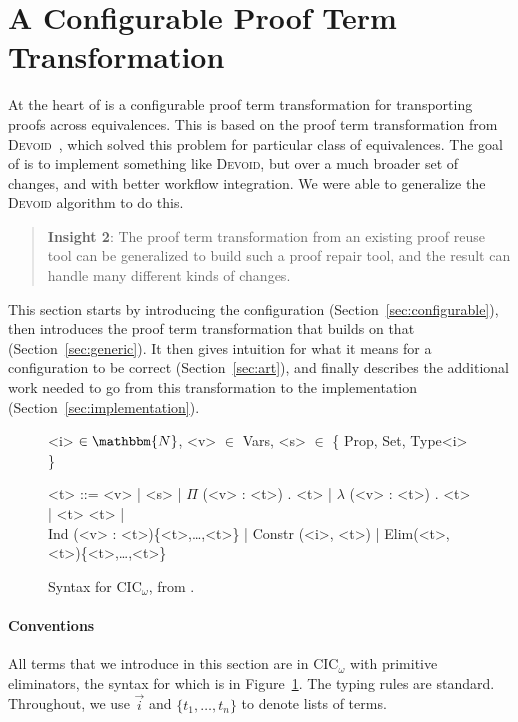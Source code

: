 \section{A Configurable Proof Term Transformation}
\label{sec:key2}

At the heart of \toolname is a configurable proof term transformation for transporting
proofs across equivalences. This is based on the proof term transformation from 
\textsc{Devoid}~\cite{Ringer2019}, which solved this problem for particular class of equivalences.
The goal of \toolname is to implement something like \textsc{Devoid}, but over
a much broader set of changes, and with better workflow integration.
We were able to generalize the \textsc{Devoid} algorithm to do this.

\begin{quote}
\textbf{Insight 2}:
The proof term transformation from an existing proof reuse tool can be generalized
to build such a proof repair tool, and the result can handle 
many different kinds of changes.
\end{quote}

This section starts by introducing the configuration (Section~\ref{sec:configurable}),
then introduces the proof term transformation that builds on that (Section~\ref{sec:generic}).
It then gives intuition for what it means for a configuration to be correct (Section~\ref{sec:art}),
and finally describes the additional work needed to go from this transformation to the implementation (Section~\ref{sec:implementation}). 

\begin{figure}
\small
\begin{grammar}
<i> $\in \mathbbm{N}$, <v> $\in$ Vars, <s> $\in$ \{ Prop, Set, Type<i> \}

<t> ::= <v> | <s> | $\Pi$ (<v> : <t>) . <t> | $\lambda$ (<v> : <t>) . <t> | <t> <t> | \\ 
Ind (<v> : <t>)\{<t>,\ldots,<t>\} | Constr (<i>, <t>) | Elim(<t>, <t>)\{<t>,\ldots,<t>\}
\end{grammar}
\vspace{-0.2cm}
\caption{Syntax for CIC$_\omega$, from \citet{Timany2015FirstST}.}
\label{fig:syntax}
\end{figure}

\paragraph{Conventions}
All terms that we introduce in this section are in CIC$_{\omega}$ with primitive eliminators,
the syntax for which is in Figure~\ref{fig:syntax}.
The typing rules are standard.
Throughout, we use $\vec{i}$ and $\{t_1, \ldots, t_n\}$ to denote lists of terms.

